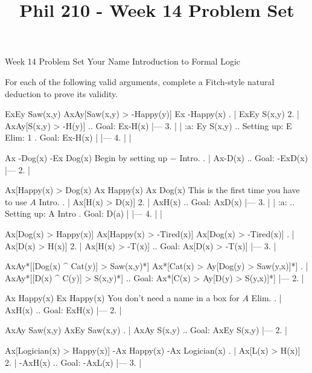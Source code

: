 
\title{Phil 210 - Week 14 Problem Set}

\heading
Week 14 Problem Set
Your Name
Introduction to Formal Logic
\endheading

For each of the following valid arguments, complete a Fitch-style natural deduction to prove its validity.

\quantifiers
\problems
{}
\argument
 ExEy Saw(x,y)
 AxAy[Saw(x,y) > -Happy(y)]
\argumentline
 Ex -Happy(x)
\endargument
	\answer
	. | ExEy S(x,y)
	 2. | AxAy[S(x,y) > -H(y)]  ..  Goal: Ex-H(x)
	    |---
	 3. |   | :a: Ey S(x,y)     ..  Setting up: E Elim: 1  .  Goal: Ex-H(x)
	    |   |---
	 4. |   |
	\endfitchproof
	\endanswer

\argument
 Ax -Dog(x)
\argumentline
 -Ex Dog(x)
\endargument
\Hint Begin by setting up $-$ Intro.
	\answer
	. | Ax-D(x)  ..  Goal: -ExD(x)
	    |---
	 2. | 
	\endfitchproof
	\endanswer

\argument
 Ax[Happy(x) > Dog(x)
 Ax Happy(x)
\argumentline
 Ax Dog(x)
\endargument
\Hint This is the first time you have to use $A$ Intro.
	\answer
	. | Ax[H(x) > D(x)]
	 2. | AxH(x)          ..  Goal: AxD(x)
	    |---
	 3. |   | :a:          ..  Setting up: A Intro  .  Goal: D(a)
	    |   |---
	 4. |   |
	\endfitchproof
	\endanswer

\argument
 Ax[Dog(x) > Happy(x)]
 Ax[Happy(x) > -Tired(x)]
\argumentline
 Ax[Dog(x) > -Tired(x)]
\endargument
	\answer
	. | Ax[D(x) > H(x)]
	 2. | Ax[H(x) > -T(x)]  ..  Goal: Ax[D(x) > -T(x)]
	    |---
	 3. | 
	\endfitchproof
	\endanswer

\argument
 AxAy*[[Dog(x) ^ Cat(y)] > Saw(x,y)*]
\argumentline
 Ax*[Cat(x) > Ay[Dog(y) > Saw(y,x)]*]
\endargument
	\answer
	. | AxAy*[[D(x) ^ C(y)] > S(x,y)*]  ..  Goal: Ax*[C(x) > Ay[D(y) > S(y,x)]*]
	    |---
	 2. | 
	\endfitchproof
	\endanswer

\argument
 Ax Happy(x)
\argumentline
 Ex Happy(x)
\endargument
\Hint You don't need a name in a box for $A$ Elim.
	\answer
	. | AxH(x)  ..  Goal: ExH(x)
	    |---
	 2. | 
	\endfitchproof
	\endanswer

\argument
 AxAy Saw(x,y)
\argumentline
 AxEy Saw(x,y)
\endargument
	\answer
	. | AxAy S(x,y)  ..  Goal: AxEy S(x,y)
	    |---
	 2. |
	\endfitchproof
	\endanswer

\argument
 Ax[Logician(x) > Happy(x)]
 -Ax Happy(x)
\argumentline
 -Ax Logician(x)
\endargument
	\answer
	. | Ax[L(x) > H(x)]
	 2. | -AxH(x)         ..  Goal: -AxL(x)
	    |---
	 3. |
	\endfitchproof
	\endanswer

\endproblems
\bye
